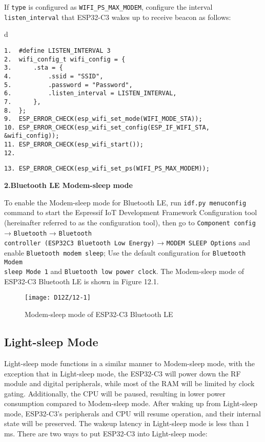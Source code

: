 \documentclass[a4paper,12pt]{book}
\begin{document}
If \verb|type| is configured as \verb|WIFI_PS_MAX_MODEM|, configure the interval \verb|listen_interval| that ESP32-C3 wakes up to receive beacon as follows:

\begin{codebloc}
\begin{tabular}{d}
\vspace{2pt}
\begin{verbatim}
1.  #define LISTEN_INTERVAL 3
2.  wifi_config_t wifi_config = {
3.      .sta = {
4.          .ssid = "SSID",
5.          .password = "Password",
6.          .listen_interval = LISTEN_INTERVAL,
7.      },
8.  };
9.  ESP_ERROR_CHECK(esp_wifi_set_mode(WIFI_MODE_STA));
10. ESP_ERROR_CHECK(esp_wifi_set_config(ESP_IF_WIFI_STA, &wifi_config));
11. ESP_ERROR_CHECK(esp_wifi_start());
12.
\end{verbatim}
\verb|13. ESP_ERROR_CHECK(esp_wifi_set_ps(WIFI_PS_MAX_MODEM));|
\end{tabular}
\end{codebloc}

\textbf{2.Bluetooth LE Modem-sleep mode}

To enable the Modem-sleep mode for Bluetooth LE, run \verb|idf.py menuconfig| command to start the Espressif IoT Development Framework Configuration tool (hereinafter referred to as the configuration tool), then go to \verb|Component config| → \verb|Bluetooth| → \verb|Bluetooth |\\ \verb|controller (ESP32C3 Bluetooth Low Energy)| → \verb|MODEM SLEEP Options| and enable \verb|Bluetooth modem sleep|; Use the default configuration for \verb|Bluetooth Modem |\\ \verb|sleep Mode 1| and \verb|Bluetooth low power clock|. The Modem-sleep mode of ESP32-C3 Bluetooth LE is shown in Figure 12.1.

\begin{figure}[!h]
    \centering
    \texttt{[image: D12Z/12-1]}
    \caption{Modem-sleep mode of ESP32-C3 Bluetooth LE}
\end{figure}

\subsection{Light-sleep Mode}
Light-sleep mode functions in a similar manner to Modem-sleep mode, with the exception that in Light-sleep mode, the ESP32-C3 will power down the RF module and digital peripherals, while most of the RAM will be limited by clock gating. Additionally, the CPU will be paused, resulting in lower power consumption compared to Modem-sleep mode. After waking up from Light-sleep mode, ESP32-C3's peripherals and CPU will resume operation, and their internal state will be preserved. The wakeup latency in Light-sleep mode is less than 1 ms. There are two ways to put ESP32-C3 into Light-sleep mode:
\end{document}

